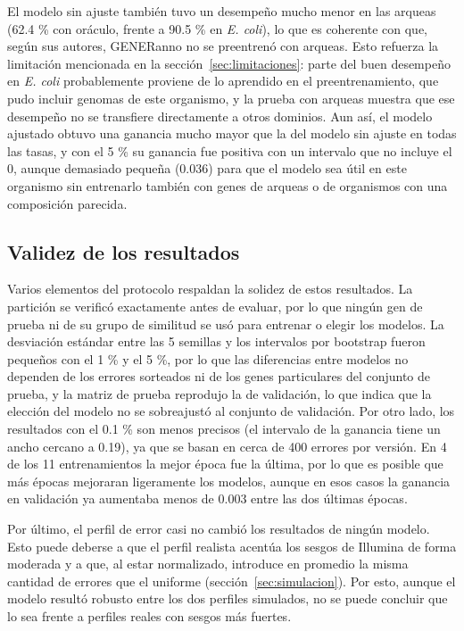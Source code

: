 \documentclass[sigconf,nonacm]{acmart}
\begin{document}
El modelo sin ajuste también tuvo un desempeño mucho menor en las arqueas (62.4 \% con oráculo, frente a 90.5 \% en \emph{E. coli}), lo que es coherente con que, según sus autores, GENERanno no se preentrenó con arqueas. Esto refuerza la limitación mencionada en la sección~\ref{sec:limitaciones}: parte del buen desempeño en \emph{E. coli} probablemente proviene de lo aprendido en el preentrenamiento, que pudo incluir genomas de este organismo, y la prueba con arqueas muestra que ese desempeño no se transfiere directamente a otros dominios. Aun así, el modelo ajustado obtuvo una ganancia mucho mayor que la del modelo sin ajuste en todas las tasas, y con el 5 \% su ganancia fue positiva con un intervalo que no incluye el 0, aunque demasiado pequeña (0.036) para que el modelo sea útil en este organismo sin entrenarlo también con genes de arqueas o de organismos con una composición parecida.

\subsection{Validez de los resultados}\label{sec:disc-validez}

Varios elementos del protocolo respaldan la solidez de estos resultados. La partición se verificó exactamente antes de evaluar, por lo que ningún gen de prueba ni de su grupo de similitud se usó para entrenar o elegir los modelos. La desviación estándar entre las 5 semillas y los intervalos por bootstrap fueron pequeños con el 1 \% y el 5 \%, por lo que las diferencias entre modelos no dependen de los errores sorteados ni de los genes particulares del conjunto de prueba, y la matriz de prueba reprodujo la de validación, lo que indica que la elección del modelo no se sobreajustó al conjunto de validación. Por otro lado, los resultados con el 0.1 \% son menos precisos (el intervalo de la ganancia tiene un ancho cercano a 0.19), ya que se basan en cerca de 400 errores por versión. En 4 de los 11 entrenamientos la mejor época fue la última, por lo que es posible que más épocas mejoraran ligeramente los modelos, aunque en esos casos la ganancia en validación ya aumentaba menos de 0.003 entre las dos últimas épocas.

Por último, el perfil de error casi no cambió los resultados de ningún modelo. Esto puede deberse a que el perfil realista acentúa los sesgos de Illumina de forma moderada y a que, al estar normalizado, introduce en promedio la misma cantidad de errores que el uniforme (sección~\ref{sec:simulacion}). Por esto, aunque el modelo resultó robusto entre los dos perfiles simulados, no se puede concluir que lo sea frente a perfiles reales con sesgos más fuertes.
\end{document}
